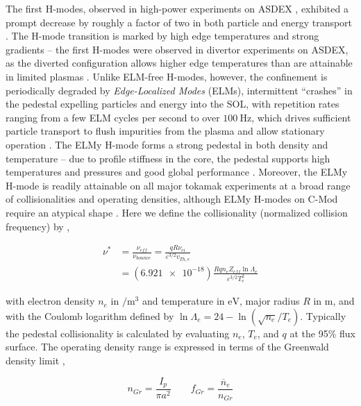 The first H-modes, observed in high-power experiments on ASDEX \cite{Wagner1982,Keilhacker1984}, exhibited a prompt decrease by roughly a factor of two in both particle and energy transport \cite{Wagner1982}.  The H-mode transition is marked by high edge temperatures and strong gradients -- the first H-modes were observed in divertor experiments on ASDEX, as the diverted configuration allows higher edge temperatures than are attainable in limited plasmas \cite{Keilhacker1984}.  Unlike ELM-free H-modes, however, the confinement is periodically degraded by \emph{Edge-Localized Modes} (ELMs), intermittent ``crashes'' in the pedestal expelling particles and energy into the SOL, with repetition rates ranging from a few ELM cycles per second to over $\SI{100}{\hertz}$, which drives sufficient particle transport to flush impurities from the plasma and allow stationary operation \cite{Keilhacker1984,Zohm1996}.  The ELMy H-mode forms a strong pedestal in both density and temperature -- due to profile stiffness in the 
core, the pedestal supports high temperatures and pressures and good global performance \cite{Greenwald1997,Suttrop2000,Schneider2013}.  Moreover, the ELMy H-mode is readily attainable on all major tokamak experiments at a broad range of collisionalities and operating densities, although ELMy H-modes on C-Mod require an atypical shape \cite{Hughes2012,Hughes2013}.  Here we define the collisionality (normalized collision frequency) by \cite{Sauter1999},

\begin{equation}\label{eq:nustar}
 \begin{aligned}
 \nu^* &= \frac{\nu_{eff}}{\nu_{bounce}} = \frac{qR\nu_{ei}}{\varepsilon^{3/2} v_{Th,e}}\\ &= \left(\num{6.921e-18}\right) \frac{Rqn_e Z_{eff} \ln \Lambda_e}{\varepsilon^{3/2} T_e^2}
 \end{aligned}
\end{equation}

\noindent with electron density $n_e$ in $\si{\per\meter\cubed}$ and temperature in $\si{\electronvolt}$, major radius $R$ in $\si{\meter}$, and with the Coulomb logarithm defined by $\ln \Lambda_e = 24 - \ln\left(\sqrt{n_e}/T_e\right)$.  Typically the pedestal collisionality is calculated by evaluating $n_e$, $T_e$, and $q$ at the 95\% flux surface.  The operating density range is expressed in terms of the Greenwald density limit \cite{Greenwald1988},

\begin{equation}\label{eq:GDL}
  n_{Gr} = \frac{I_p}{\pi a^2} \qquad f_{Gr} = \frac{\overline{n}_e}{n_{Gr}}
\end{equation}

